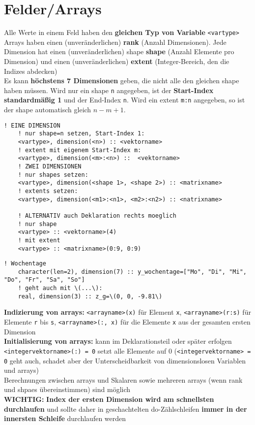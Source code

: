 \documentclass[a4paper, twocolumn]{scrarticle}
\begin{document}
  \section{Felder/Arrays}
  Alle Werte in einem Feld haben den \textbf{gleichen Typ von Variable} \lstinline|<vartype>|\\
  Arrays haben einen (unveränderlichen) \textbf{rank} (Anzahl Dimensionen). Jede Dimension hat einen (unveränderlichen) shape \textbf{shape} (Anzahl Elemente pro Dimension) und einen (unveränderlichen) \textbf{extent} (Integer-Bereich, den die Indizes abdecken)\\
  Es kann \textbf{höchstens 7 Dimensionen} geben, die nicht alle den gleichen shape haben müssen. Wird nur ein shape \lstinline|n| angegeben, ist der \textbf{Start-Index standardmäßig 1} und der End-Index \lstinline|n|. Wird ein extent \lstinline|m:n| angegeben, so ist der shape automatisch gleich $n-m+1$.
  \begin{lstlisting}[caption={\bfseries Deklarationsmöglichkeiten arrays}]
    ! EINE DIMENSION
    ! nur shape=n setzen, Start-Index 1:
    <vartype>, dimension(<n>) :: <vektorname>
    ! extent mit eigenem Start-Index m:
    <vartype>, dimension(<m>:<n>) ::  <vektorname>
    ! ZWEI DIMENSIONEN
    ! nur shapes setzen:
    <vartype>, dimension(<shape 1>, <shape 2>) :: <matrixname>
    ! extents setzen:
    <vartype>, dimension(<m1>:<n1>, <m2>:<n2>) :: <natrixname>
    
    ! ALTERNATIV auch Deklaration rechts moeglich
    ! nur shape
    <vartype> :: <vektorname>(4)
    ! mit extent
    <vartype> :: <matrixname>(0:9, 0:9)
  \end{lstlisting}
  \begin{lstlisting}[caption={\bfseries Beispiele direkte Definition arrays}]
    ! Wochentage
    character(len=2), dimension(7) :: y_wochentage=["Mo", "Di", "Mi", "Do", "Fr", "Sa", "So"]
    ! geht auch mit \(...\):
    real, dimension(3) :: z_g=\(0, 0, -9.81\)
  \end{lstlisting}
  \textbf{Indizierung von arrays:} \lstinline|<arrayname>(x)| für Element \lstinline|x|, \lstinline|<arrayname>(r:s)| für Elemente \lstinline|r| bis \lstinline|s|, \lstinline|<arrayname>(:, x)| für die Elemente \lstinline|x| aus der gesamten ersten Dimension\\
  \textbf{Initialisierung von arrays:} kann im Deklarationsteil oder später erfolgen \lstinline|<integervektorname>(:) = 0| setzt alle Elemente auf 0 (\lstinline|<integervektorname> = 0| geht auch, schadet aber der Unterscheidbarkeit von dimensionslosen Variablen und arrays)\\
  Berechnungen zwischen arrays und Skalaren sowie mehreren arrays (wenn rank und shpaes übereinstimmen) sind möglich\\
  \textbf{WICHTIG:} \textbf{Index der ersten Dimension wird am schnellsten durchlaufen} und sollte daher in geschachtelten do-Zählschleifen \textbf{immer in der innersten Schleife} durchlaufen werden
  
\end{document}
